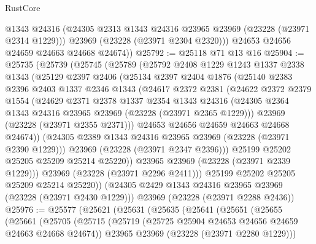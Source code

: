 \begin{lexlean}{RustCore}
\begin{coremodule}
          @1343
          @24316
          (@24305 @2313 @1343 @24316 @23965 @23969 (@23228 (@23971 @2314 @1229)))
          @23969
          (@23228 (@23971 @2304 @2320)))
        @24653
        @24656
        @24659
        @24663
        @24668
        @24674))
@25792 := @25118 @71 @13 @16
@25904 := @25735
    (@25739
      (@25745
        (@25789
          (@25792
            @2408
            @1229
            @1243
            @1337
            @2338
            @1343
            (@25129
              @2397
              @2406
              (@25134
                @2397
                @2404
                @1876
                (@25140
                  @2383
                  @2396
                  @2403
                  @1337
                  @2346
                  @1343
                  (@24617
                    @2372
                    @2381
                    (@24622
                      @2372
                      @2379
                      @1554
                      (@24629
                        @2371
                        @2378
                        @1337
                        @2354
                        @1343
                        @24316
                        (@24305 @2364 @1343 @24316 @23965 @23969 (@23228 (@23971 @2365 @1229)))
                        @23969
                        (@23228 (@23971 @2355 @2371)))
                      @24653
                      @24656
                      @24659
                      @24663
                      @24668
                      @24674))
                  (@24305 @2389 @1343 @24316 @23965 @23969 (@23228 (@23971 @2390 @1229)))
                  @23969
                  (@23228 (@23971 @2347 @2396)))
                @25199
                @25202
                @25205
                @25209
                @25214
                @25220))
            @23965
            @23969
            (@23228 (@23971 @2339 @1229)))
          @23969
          (@23228 (@23971 @2296 @2411)))
        @25199
        @25202
        @25205
        @25209
        @25214
        @25220))
    (@24305 @2429 @1343 @24316 @23965 @23969 (@23228 (@23971 @2430 @1229)))
    @23969
    (@23228 (@23971 @2288 @2436))
@25976 := @25577
    (@25621
      (@25631
        (@25635
          (@25641
            (@25651
              (@25655
                (@25661
                  (@25705
                    (@25715
                      (@25719 (@25725 @25904 @24653 @24656 @24659 @24663 @24668 @24674))
                      @23965
                      @23969
                      (@23228 (@23971 @2280 @1229)))

\end{coremodule}
\end{lexlean}
